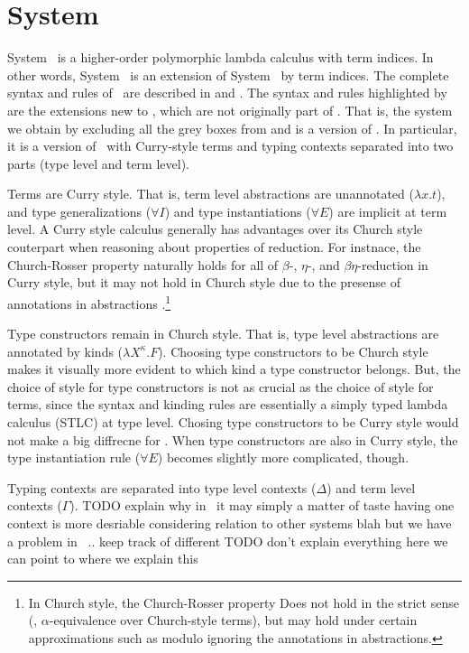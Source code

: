 \section{System \Fi}
\label{sec:Fi}
System \Fi\ is a higher-order polymorphic lambda calculus with term indices.
In other words, System \Fi\ is an extension of System \Fw\ by term indices.
The complete syntax and rules of \Fi\ are described in  and
. The syntax and rules highlighted by 
are the extensions new to \Fi, which are not originally part of \Fw.
That is, the system we obtain by excluding all the grey boxes from 
and  is a version of \Fw. In particular, it is a version of \Fw\
with Curry-style terms and typing contexts separated into two parts
(type level and term level).

Terms are Curry style. That is, term level abstractions are unannotated
($\lambda x.t$), and type generalizations ($\forall I$) and type instantiations
($\forall E$) are implicit at term level. A Curry style calculus generally has
advantages over its Church style couterpart when reasoning about properties of
reduction. For instnace, the Church-Rosser property naturally holds for all
of $\beta$-, $\eta$-, and $\beta\eta$-reduction in Curry style, but
it may not hold in Church style due to the presense of annotations in
abstractions \cite{Miquel01}.\footnote{In Church style, the Church-Rosser
	property Does not hold in the strict sense
	(\ie, $\alpha$-equivalence over Church-style terms),
	but may hold under certain approximations such as
	modulo ignoring the annotations in abstractions.}

Type constructors remain in Church style. That is, type level abstractions are
annotated by kinds ($\lambda X^\kappa.F$). Choosing type constructors
to be Church style makes it visually more evident to which kind
a type constructor belongs. But, the choice of style for type constructors
is not as crucial as the choice of style for terms, since the syntax and
kinding rules are essentially a simply typed lambda calculus (STLC)
at type level. Chosing type constructors to be Curry style would not
make a big diffrecne for \Fi. When type constructors are also in Curry style,
the type instantiation rule ($\forall E$) becomes slightly more complicated,
though.

Typing contexts are separated into type level contexts ($\Delta$) and
term level contexts ($\Gamma$). TODO explain why in \Fw\ it may simply
a matter of taste having one context is more desriable considering
relation to other systems blah but we have a problem in \Fi\ ..
keep track of different
TODO don't explain everything here we can point to where we explain this

